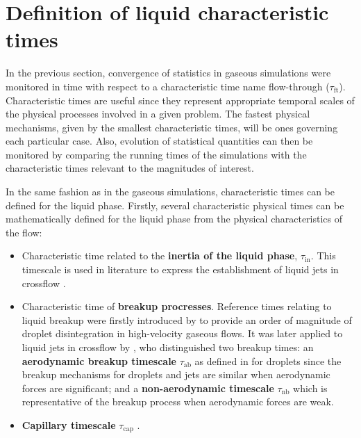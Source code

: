 \section{Definition of liquid characteristic times}

In the previous section, convergence of statistics in gaseous simulations were monitored in time with respect to a characteristic time name flow-through ($\tau_\mathrm{ft}$). Characteristic times are useful since they represent appropriate temporal scales of the physical processes involved in a given problem. The fastest physical mechanisms, given by the smallest characteristic times, will be ones governing each particular case. Also, evolution of statistical quantities can then be monitored by comparing the running times of the simulations with the characteristic times relevant to the magnitudes of interest. 

In the same fashion as in the gaseous simulations, characteristic times can be defined for the liquid phase. Firstly, several characteristic physical times can be mathematically defined for the liquid phase from the physical characteristics of the flow:

\begin{itemize}

	\item Characteristic time related to the \textbf{ inertia of the liquid phase}, $\tau_\mathrm{in}$. This timescale is used in literature to express the establishment of liquid jets in crossflow .

	\item Characteristic time of \textbf{breakup procresses}. Reference times relating to liquid breakup were firstly introduced by  to provide an order of magnitude of droplet disintegration in high-velocity gaseous flows. It was later applied to liquid jets in crossflow by , who distinguished two breakup times: an \textbf{aerodynamic breakup timescale} $\tau_\mathrm{ab}$ as defined in  for droplets since the breakup mechanisms for droplets and jets are similar when aerodynamic forces are significant; and a \textbf{non-aerodynamic timescale} $\tau_\mathrm{nb}$ which is representative of the breakup process when aerodynamic forces are weak.
	
	\item \textbf{Capillary timescale} $\tau_\mathrm{cap}$ .
	
	


\end{itemize}

